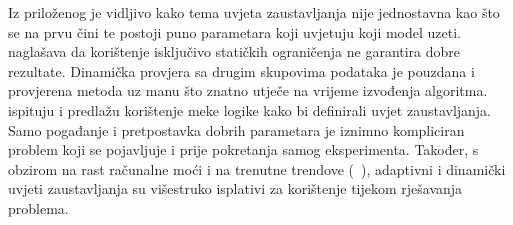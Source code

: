 Iz priloženog je vidljivo kako tema uvjeta zaustavljanja nije jednostavna kao što se na prvu čini te postoji puno parametara koji uvjetuju koji model uzeti.
~\cite{ga_stopping_criteria} naglašava da korištenje isključivo statičkih ograničenja ne garantira dobre rezultate.
Dinamička provjera sa drugim skupovima podataka je pouzdana i provjerena metoda uz manu što znatno utječe na vrijeme izvođenja algoritma.
~\cite{fuzzy_logic} ispituju i predlažu korištenje meke logike kako bi definirali uvjet zaustavljanja.
Samo pogađanje i pretpostavka dobrih parametara je iznimno kompliciran problem koji se pojavljuje i prije pokretanja samog eksperimenta.
Također, s obzirom na rast računalne moći i na trenutne trendove (~\cite{ga_stopping_criteria}), adaptivni i dinamički uvjeti zaustavljanja su višestruko isplativi za korištenje tijekom rješavanja problema.

